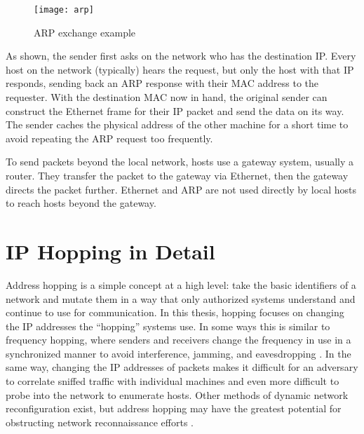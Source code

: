\begin{figure}[ht]
\caption{\ac{ARP} exchange example}
\label{fig:arp_example}
\centering
\texttt{[image: arp]}
\end{figure}

\par As shown, the sender first asks on the network who has the destination \ac{IP}. Every host on the network (typically) hears the request, but only the host with that \ac{IP} responds, sending back an \ac{ARP} response with their \ac{MAC} address to the requester. With the destination \ac{MAC} now in hand, the original sender can construct the Ethernet frame for their \ac{IP} packet and send the data on its way. The sender caches the physical address of the other machine for a short time to avoid repeating the \ac{ARP} request too frequently.

\par To send packets beyond the local network, hosts use a gateway system, usually a router. They transfer the packet to the gateway via Ethernet, then the gateway directs the packet further. Ethernet and \ac{ARP} are not used directly by local hosts to reach hosts beyond the gateway.

\section{IP Hopping in Detail}
\label{sec:hopping}
\par Address hopping is a simple concept at a high level: take the basic identifiers of a network and mutate them in a way that only authorized systems understand and continue to use for communication. In this thesis, hopping focuses on changing the \ac{IP} addresses the ``hopping'' systems use. In some ways this is similar to frequency hopping, where senders and receivers change the frequency in use in a synchronized manner to avoid interference, jamming, and eavesdropping \cite{FreqHop}. In the same way, changing the \ac{IP} addresses of packets makes it difficult for an adversary to correlate sniffed traffic with individual machines and even more difficult to probe into the network to enumerate hosts. Other methods of dynamic network reconfiguration exist, but address hopping may have the greatest potential for obstructing network reconnaissance efforts \cite{DefeatingAdversaryNIE}.

